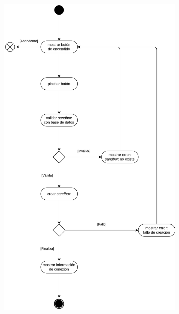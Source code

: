             \begin{figure}[h]
                \centering
                
                \begin{subfigure}{0.45\textwidth}
                    \centering
                    
                    \includegraphics[scale=0.115]{images/Diagramas/Actividades y transiciones 4.png}
                    

\end{subfigure}
\end{figure}
